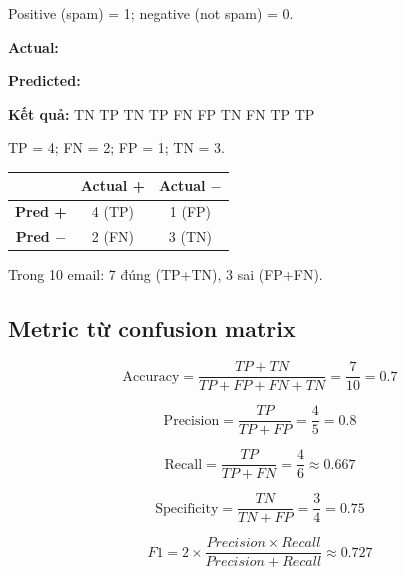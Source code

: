 \begin{phuongphap}[title={10 email --- nhãn}]
Positive (spam) = 1; negative (not spam) = 0.

\textbf{Actual:} 

\textbf{Predicted:} 

\textbf{Kết quả:} \quad TN\; TP\; TN\; TP\; FN\; FP\; TN\; FN\; TP\; TP
\end{phuongphap}

\begin{phuongphap}[title={Đếm}]
TP = 4; FN = 2; FP = 1; TN = 3.

\begin{center}
\begin{tabular}{c|cc}
 & \textbf{Actual +} & \textbf{Actual $-$} \\
\hline
\textbf{Pred +} & 4 (TP) & 1 (FP) \\
\textbf{Pred $-$} & 2 (FN) & 3 (TN) \\
\end{tabular}
\end{center}

Trong 10 email: 7 đúng (TP+TN), 3 sai (FP+FN).
\end{phuongphap}

\subsection{Metric từ confusion matrix}

\begin{tinhchat}[title={Accuracy}]
\[
\mathrm{Accuracy} = \frac{TP+TN}{TP+FP+FN+TN} = \frac{7}{10} = 0.7
\]
\end{tinhchat}

\begin{tinhchat}[title={Precision}]
\[
\mathrm{Precision} = \frac{TP}{TP+FP} = \frac{4}{5} = 0.8
\]
\end{tinhchat}

\begin{tinhchat}[title={Recall (Sensitivity)}]
\[
\mathrm{Recall} = \frac{TP}{TP+FN} = \frac{4}{6} \approx 0.667
\]
\end{tinhchat}

\begin{tinhchat}[title={Specificity}]
\[
\mathrm{Specificity} = \frac{TN}{TN+FP} = \frac{3}{4} = 0.75
\]
\end{tinhchat}

\begin{tinhchat}[title={F1 Score}]
\[
F1 = 2 \times \frac{Precision \times Recall}{Precision + Recall} \approx 0.727
\]
\end{tinhchat}

